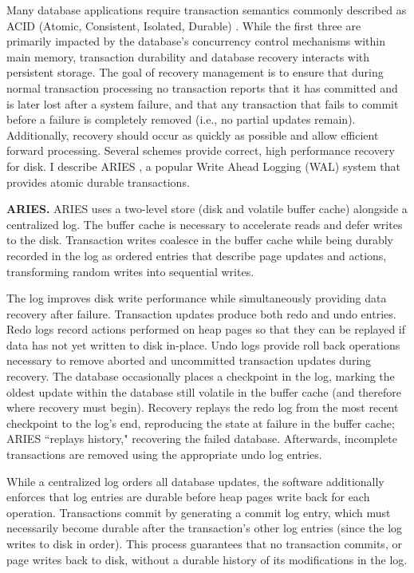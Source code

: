 Many database applications require transaction semantics commonly described as ACID (Atomic, Consistent, Isolated, Durable) \cite{Gray81}.
While the first three are primarily impacted by the database's concurrency control mechanisms within main memory, transaction durability and database recovery interacts with persistent storage.
The goal of recovery management is to ensure that during normal transaction processing no transaction reports that it has committed and is later lost after a system failure, and that any transaction that fails to commit before a failure is completely removed (i.e., no partial updates remain).
Additionally, recovery should occur as quickly as possible and allow efficient forward processing.
Several schemes provide correct, high performance recovery for disk.
I describe ARIES \cite{MohanHaderle92}, a popular Write Ahead Logging (WAL) system that provides atomic durable transactions.

\textbf{ARIES.}
ARIES uses a two-level store (disk and volatile buffer cache) alongside a centralized log.
The buffer cache is necessary to accelerate reads and defer writes to the disk.
Transaction writes coalesce in the buffer cache while being durably recorded in the log as ordered entries that describe page updates and actions, transforming random writes into sequential writes.

The log improves disk write performance while simultaneously providing data recovery after failure.
Transaction updates produce both redo and undo entries.
Redo logs record actions performed on heap pages so that they can be replayed if data has not yet written to disk in-place.
Undo logs provide roll back operations necessary to remove aborted and uncommitted transaction updates during recovery.
The database occasionally places a checkpoint in the log, marking the oldest update within the database still volatile in the buffer cache (and therefore where recovery must begin).
Recovery replays the redo log from the most recent checkpoint to the log's end, reproducing the state at failure in the buffer cache; ARIES ``replays history," recovering the failed database.
Afterwards, incomplete transactions are removed using the appropriate undo log entries.

While a centralized log orders all database updates, the software additionally enforces that log entries are durable before heap pages write back for each operation.
Transactions commit by generating a commit log entry, which must necessarily become durable after the transaction's other log entries (since the log writes to disk in order).
This process guarantees that no transaction commits, or page writes back to disk, without a durable history of its modifications in the log.

